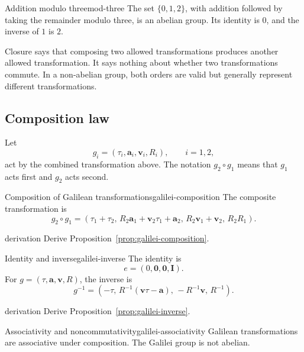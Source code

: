 \documentclass[11pt,a4paper]{article}
\newcommand{\vect}[1]{\bm{#1}}
\newcommand{\id}{\mathbf{I}}
\begin{document}
\begin{examplebox}{Addition modulo three}{mod-three}
The set \(\{0,1,2\}\), with addition followed by taking the remainder modulo
three, is an abelian group. Its identity is \(0\), and the inverse of \(1\) is
\(2\).
\end{examplebox}

\begin{precision}
Closure says that composing two allowed transformations produces another
allowed transformation. It says nothing about whether two transformations
commute. In a non-abelian group, both orders are valid but generally represent
different transformations.
\end{precision}

\subsection{Composition law}

Let
\[
  g_i=(\tau_i,\vect{a}_i,\vect{v}_i,R_i),\qquad i=1,2,
\]
act by the combined transformation above. The notation \(g_2\circ g_1\)
means that \(g_1\) acts first and \(g_2\) acts second.

\begin{proposition}{Composition of Galilean transformations}{galilei-composition}
The composite transformation is
\[
\boxed{
g_2\circ g_1=
\left(
\tau_1+\tau_2,\,
R_2\vect{a}_1+\vect{v}_2\tau_1+\vect{a}_2,\,
R_2\vect{v}_1+\vect{v}_2,\,
R_2R_1
\right).
}
\]
\end{proposition}

\begin{studentwork}[height=5.0cm]{derivation}
Derive Proposition~\ref{prop:galilei-composition}.
\end{studentwork}

\begin{proposition}{Identity and inverse}{galilei-inverse}
The identity is
\[
  e=(0,\vect{0},\vect{0},\id).
\]
For \(g=(\tau,\vect{a},\vect{v},R)\), the inverse is
\[
\boxed{
g^{-1}
=
\left(
-\tau,\,
R^{-1}(\vect{v}\tau-\vect{a}),\,
-R^{-1}\vect{v},\,
R^{-1}
\right).
}
\]
\end{proposition}

\begin{studentwork}[height=8.0cm]{derivation}
Derive Proposition~\ref{prop:galilei-inverse}.
\end{studentwork}

\begin{proposition}{Associativity and noncommutativity}{galilei-associativity}
Galilean transformations are associative under composition. The Galilei group
is not abelian.
\end{proposition}
\end{document}
